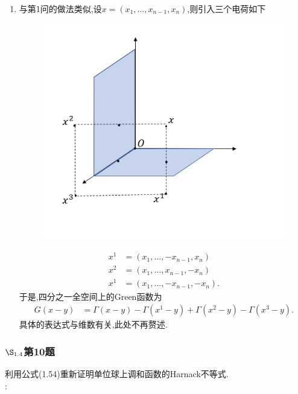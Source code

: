 \documentclass[12pt, a4paper]{ctexart}
\begin{document}
\begin{enumerate}
		\item 与第1问的做法类似,设$x=(x_1, \dots ,x_{n−1}, x_n)$,则引入三个电荷如下
		\begin{figure}[htbp]
			\centering
			\includegraphics[scale=0.6]{PDE1_4_9_2.jpg}
		\end{figure}	
		\begin{align*}
			x^1&=(x_1, \dots ,-x_{n−1}, x_n)\\
			x^2&=(x_1, \dots ,x_{n−1}, -x_n)\\
			x^1&=(x_1, \dots ,-x_{n−1},- x_n).
		\end{align*}
		于是,四分之一全空间上的Green函数为
		\begin{align*}
		G(x-y)&=\Gamma(x-y)-\Gamma(x^1-y)+\Gamma(x^2-y)-\Gamma(x^3-y).
		\end{align*}
		具体的表达式与维数有关,此处不再赘述.
	\end{enumerate}
	
	\subsubsection{$\S_{1.4}$第10题}
	\kaishu{}利用公式(1.54)重新证明单位球上调和函数的Harnack不等式.\\

	\songti{}:\\
	
\end{document}
